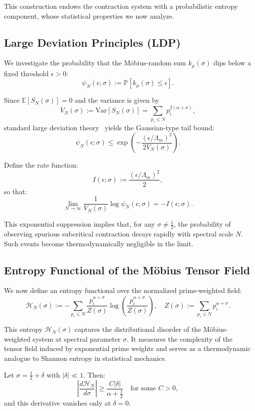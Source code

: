 \documentclass[12pt]{article}
\begin{document}
This construction endows the contraction system with a probabilistic entropy component, whose statistical properties we now analyze.

\subsection{Large Deviation Principles (LDP)}

We investigate the probability that the Möbius-random sum $k_\mu(\sigma)$ dips below a fixed threshold $\epsilon > 0$:
\[
\psi_N(\epsilon; \sigma) := \mathbb{P}\left[ k_\mu(\sigma) \le \epsilon \right].
\]

Since $\mathbb{E}[S_N(\sigma)] = 0$ and the variance is given by
\[
V_N(\sigma) := \mathrm{Var}[S_N(\sigma)] = \sum_{p_i \le N} p_i^{2(\alpha + \sigma)},
\]
standard large deviation theory~\cite{ellis1985entropy} yields the Gaussian-type tail bound:
\[
\psi_N(\epsilon; \sigma) \le \exp\left( -\frac{(\epsilon / \Lambda_m)^2}{2 V_N(\sigma)} \right).
\]

Define the rate function:
\[
I(\epsilon; \sigma) := \frac{(\epsilon / \Lambda_m)^2}{2},
\]
so that:
\[
\lim_{N \to \infty} \frac{1}{V_N(\sigma)} \log \psi_N(\epsilon; \sigma) = -I(\epsilon; \sigma).
\]

This exponential suppression implies that, for any $\sigma \ne \tfrac{1}{2}$, the probability of observing spurious subcritical contraction decays rapidly with spectral scale $N$. Such events become thermodynamically negligible in the limit.

\subsection{Entropy Functional of the Möbius Tensor Field}

We now define an entropy functional over the normalized prime-weighted field:
\[
\mathcal{H}_N(\sigma) := - \sum_{p_i \le N} \frac{p_i^{\alpha + \sigma}}{Z(\sigma)} \log \left( \frac{p_i^{\alpha + \sigma}}{Z(\sigma)} \right), \quad Z(\sigma) := \sum_{p_i \le N} p_i^{\alpha + \sigma}.
\]

This entropy $\mathcal{H}_N(\sigma)$ captures the distributional disorder of the Möbius-weighted system at spectral parameter $\sigma$. It measures the complexity of the tensor field induced by exponential prime weights and serves as a thermodynamic analogue to Shannon entropy in statistical mechanics.

\begin{theorem}
\label{thm:entropy_disparity}
Let $\sigma = \tfrac{1}{2} + \delta$ with $|\delta| \ll 1$. Then:
\[
\left| \frac{d\mathcal{H}_N}{d\sigma} \right| \ge \frac{C |\delta|}{\alpha + \tfrac{1}{2}} \quad \text{for some } C > 0,
\]
and this derivative vanishes only at $\delta = 0$.
\end{theorem}
\end{document}
